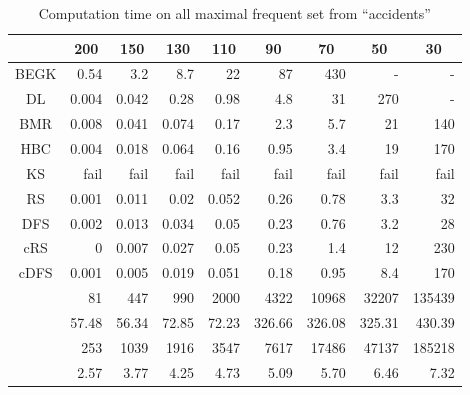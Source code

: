 \begin{table}
\caption{Computation time on all maximal frequent set from ``accidents''}
\label{ac}
\begin{center}
\begin{tabular}[c]{| r | r | r | r | r | r | r | r | r |}
\hline
\multicolumn{1}{|c||}{} & \multicolumn{1}{|c|}{200} & \multicolumn{1}{|c|}{150} & \multicolumn{1}{|c|}{130} & \multicolumn{1}{|c|}{110} & \multicolumn{1}{|c|}{90} & \multicolumn{1}{|c|}{70} & \multicolumn{1}{|c|}{50} & \multicolumn{1}{|c|}{30} \\\hline 
\multicolumn{1}{|c||}{BEGK} & 0.54 & 3.2 & 8.7 & 22 & 87 & 430 & - & - \\\hline
\multicolumn{1}{|c||}{DL} & 0.004 & 0.042 & 0.28 & 0.98 & 4.8 & 31 & 270 & - \\\hline
\multicolumn{1}{|c||}{BMR} & 0.008 & 0.041 & 0.074 & 0.17 & 2.3 & 5.7 & 21 & 140 \\\hline
\multicolumn{1}{|c||}{HBC} & 0.004 & 0.018 & 0.064 & 0.16 & 0.95 & 3.4 & 19 & 170 \\\hline
\multicolumn{1}{|c||}{KS} & fail & fail & fail & fail & fail & fail & fail & fail \\\hline
\multicolumn{1}{|c||}{RS} & 0.001 & 0.011 & 0.02 & 0.052 & 0.26 & 0.78 & 3.3 & 32\\\hline
\multicolumn{1}{|c||}{DFS} & 0.002 & 0.013 & 0.034 & 0.05 & 0.23 & 0.76 & 3.2 & 28\\\hline
\multicolumn{1}{|c||}{cRS} & 0 & 0.007 & 0.027 & 0.05 & 0.23 & 1.4 & 12 & 230\\\hline
\multicolumn{1}{|c||}{cDFS} & 0.001 & 0.005 & 0.019 & 0.051 & 0.18 & 0.95 & 8.4 & 170\\\hline
\hline
\multicolumn{1}{|c||}{} & 81 & 447 & 990 & 2000 & 4322 & 10968 & 32207 & 135439\\\hline
\multicolumn{1}{|c||}{} & 57.48 & 56.34 & 72.85 & 72.23 & 326.66 & 326.08 & 325.31 & 430.39 \\\hline
\multicolumn{1}{|c||}{} & 253 & 1039 & 1916 & 3547 & 7617 & 17486 & 47137 & 185218\\\hline
\multicolumn{1}{|c||}{} & 2.57 & 3.77 & 4.25 & 4.73 & 5.09 & 5.70 & 6.46 & 7.32 \\\hline
\end{tabular}
\end{center}
\end{table}

